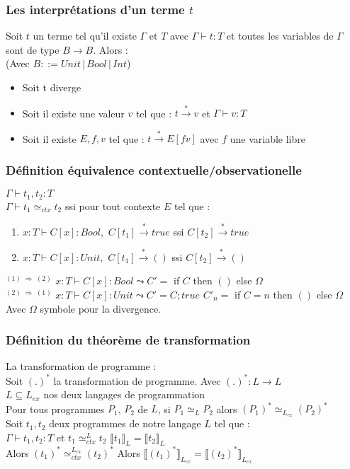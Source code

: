 \documentclass[11pt, a4paper, notitlepage]{article}
\newcommand\tab{{\hspace*{12.5mm}}}
\begin{document}
\subsubsection{Les interprétations d'un terme $t$}

\tab Soit $t$ un terme tel qu'il existe $\Gamma$ et $T$ avec $\Gamma \vdash t : T$ et toutes les variables de $\Gamma$ sont de type $B \to B$. Alors :\\
(Avec $B ::= Unit \, | \, Bool \, | \, Int$)
\begin{itemize}[label=*]
   \item Soit t diverge
   \item Soit il existe une valeur $v$ tel que : $t \xrightarrow{*} v$ et $\Gamma \vdash v : T$
   \item Soit il existe $E, f, v$ tel que : $t \xrightarrow{*} E[fv]$ avec $f$ une variable libre
\end{itemize}

\subsubsection{Définition équivalence contextuelle/observationelle}
$\Gamma \vdash t_1, t_2 : T$\\
$\Gamma \vdash t_1 \simeq_{ctx} t_2$ ssi pour tout contexte $E$ tel que :
\begin{enumerate}[label=$^{(\arabic*)}$]
   \item $x:T \vdash C[x] : Bool,$ \qquad $C[t_1] \xrightarrow{*} true$ ssi $C[t_2] \xrightarrow{*} true$
   \item $x:T \vdash C[x] : Unit,$ \qquad $C[t_1] \xrightarrow{*} ()$ ssi $C[t_2] \xrightarrow{*} ()$
\end{enumerate}
$^{(1) \; \Rightarrow \; (2)}$ $x:T \vdash C[x] : Bool \leadsto C' =$ if $C$ then $()$ else $\Omega$\\
$^{(2) \; \Rightarrow \; (1)}$ $x:T \vdash C[x] : Unit \leadsto C' =  C; true$ \qquad $C'_n =$ if $C = n$ then $()$ else $\Omega$\\
Avec $\Omega$ symbole pour la divergence.

\subsubsection{Définition du théorème de transformation}
\tab La transformation de programme :\\
Soit $( . )^*$ la transformation de programme. Avec $( . )^*:L \to L$\\
$L \subseteq L_{ex}$ nos deux langages de programmation\\
Pour tous programmes $P_1$, $P_2$ de $L$, si $P_1 \simeq_L P_2$ alors $(P_1)^* \simeq_{L_{ex}} (P_2)^*$\\
Soit $t_1, t_2$ deux programmes de notre langage $L$ tel que :\\
$\Gamma \vdash t_1, t_2:T$ et $t_1 \simeq^L_{ctx} t_2$ \qquad $\llbracket t_1 \rrbracket_L = \llbracket t_2 \rrbracket_L $\\
Alors $(t_1)^* \simeq^{L_{ex}}_{ctx} (t_2)^*$ \qquad Alors $\llbracket (t_1)^* \rrbracket_{L_{ex}} = \llbracket (t_2)^* \rrbracket_{L_{ex}}$
\end{document}
